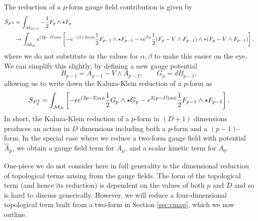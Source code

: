 The reduction of a $p$-form gauge field contribution is given by
\begin{equation*}
\begin{aligned}
	\hat{S}_{F^2} &=   \int_{{\cal M}_{D+1}} -\frac{1}{2} F_p \wedge \star F_p  \\
	&\to \int_{{\cal M}_D}  e^{(2p - D)\alpha \phi} \left[-e^{-(\beta + 2\alpha)\phi} \frac{1}{2} F_{p-1} \wedge \star F_{p-1} - \epsilon e^{\beta \phi} \frac{1}{2} (F_p - V \wedge F_{p-1}) \wedge \star (F_p - V \wedge F_{p-1}) \right],
\end{aligned}
\end{equation*}
where we do not substitute in the values for $\alpha, \beta$ to make this easier on the eye. We can simplify this slightly, by defining a new gauge potential
\begin{equation*}
	B_{p-1} = A_{p-1} - V \wedge A_{p-2}, \qquad G_{p} = dB_{p-1},
\end{equation*}
allowing us to write down the Kaluza-Klein reduction of a $p$-form as
\begin{equation}
\label{eq:dimgauge}
	S_{F_p^2} = \int_{{\cal M}_D} \left[- \epsilon e^{(2p - 2)\alpha \phi} \frac{1}{2} G_{p} \wedge \star G_p - e^{2 (p - D) \alpha \phi} \frac{1}{2} F_{p-1} \wedge \star F_{p-1} \right].
\end{equation}
In short, the Kaluza-Klein reduction of a $p$-form in $(D+1)$ dimensions produces an action in $D$ dimensions including both a $p$-form and a $(p-1)$-form. In the special case where we reduce a two-form gauge field with potential $\hat{A}_{\hat{\mu}}$, we obtain a gauge field term for $A_\mu$, and a scalar kinetic term for $A_0$.

One-piece we do not consider here in full generality is the dimensional reduction of topological terms arising from the gauge fields. The form of the topological term (and hence its reduction) is dependent on the values of both $p$ and $D$ and so is hard to discuss generically. However, we will reduce a four-dimensional topological term built from a two-form in Section \ref{sec:cmap}, which we now outline.

